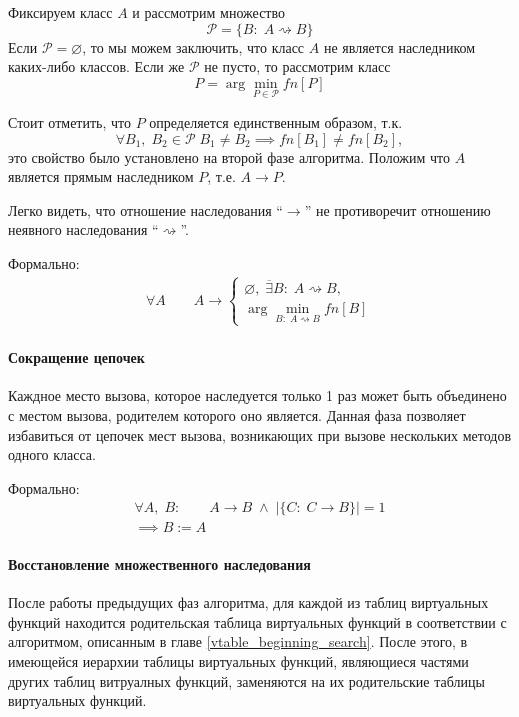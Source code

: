 \documentclass[a4paper,12pt,russian]{article}
\begin{document}
Фиксируем класс $A$ и рассмотрим множество \[\mathcal{P} = \{B:\; A \rightsquigarrow B\}\]
Если $\mathcal{P} = \varnothing$, то мы можем заключить, что класс $A$ не является наследником каких-либо классов. Если же $\mathcal{P}$ не пусто, то рассмотрим класс \[P = \arg \min_{P \in \mathcal{P}}fn[P]\]

Стоит отметить, что $P$ определяется единственным образом, т.к. \[\forall B_1,\;B_2 \in \mathcal{P}\; B_1 \neq B_2 \implies fn[B_1] \neq fn[B_2],\]
это свойство было установлено на второй фазе алгоритма.
Положим что $A$ является прямым наследником $P$, т.е. $A \rightarrow P$.

Легко видеть, что отношение наследования ``$\rightarrow$'' не противоречит отношению неявного наследования ``$\rightsquigarrow$''.

Формально:
\begin{eqnarray*}
\forall A\qquad A \rightarrow \begin{cases}
\varnothing,\; \overline{\exists} B:\; A \rightsquigarrow B,\\
\arg\min\limits_{B:\; A \rightsquigarrow B}fn[B]
\end{cases}
\end{eqnarray*}

\paragraph{Сокращение цепочек}
Каждное место вызова, которое наследуется только 1 раз может быть объединено с местом вызова, родителем которого оно является.
Данная фаза позволяет избавиться от цепочек мест вызова, возникающих при вызове нескольких методов одного класса.

Формально:
\begin{eqnarray*}
\forall A,\;B:\qquad A \rightarrow B\;\wedge\;|\{C:\; C \rightarrow B\}| = 1\\
\implies B := A
\end{eqnarray*}

\paragraph{Восстановление множественного наследования}
После работы предыдущих фаз алгоритма, для каждой из таблиц виртуальных функций находится родительская таблица виртуальных функций в соответствии с алгоритмом, описанным в главе \ref{vtable_beginning_search}.
После этого, в имеющейся иерархии таблицы виртуальных функций, являющиеся частями других таблиц витруалных функций, заменяются на их родительские таблицы виртуальных функций.
\end{document}
